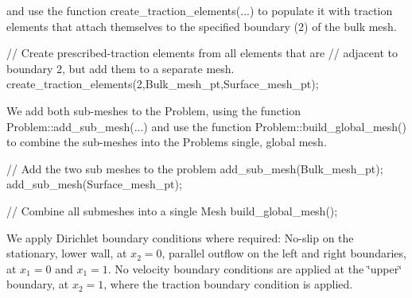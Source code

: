 and use the function {\ttfamily create\+\_\+traction\+\_\+elements}(...) to populate it with traction elements that attach themselves to the specified boundary (2) of the bulk mesh.


\begin{DoxyCodeInclude}

 \textcolor{comment}{// Create prescribed-traction elements from all elements that are }
 \textcolor{comment}{// adjacent to boundary 2, but add them to a separate mesh.}
 create\_traction\_elements(2,Bulk\_mesh\_pt,Surface\_mesh\_pt);

\end{DoxyCodeInclude}


We add both sub-\/meshes to the {\ttfamily Problem}, using the function {\ttfamily Problem\+::add\+\_\+sub\+\_\+mesh}(...) and use the function {\ttfamily Problem\+::build\+\_\+global\+\_\+mesh()} to combine the sub-\/meshes into the {\ttfamily Problem\textquotesingle{}s} single, global mesh.


\begin{DoxyCodeInclude}

 \textcolor{comment}{// Add the two sub meshes to the problem}
 add\_sub\_mesh(Bulk\_mesh\_pt);
 add\_sub\_mesh(Surface\_mesh\_pt);

 \textcolor{comment}{// Combine all submeshes into a single Mesh}
 build\_global\_mesh();

\end{DoxyCodeInclude}


We apply Dirichlet boundary conditions where required\+: No-\/slip on the stationary, lower wall, at $ x_2=0 $, parallel outflow on the left and right boundaries, at $ x_1=0 $ and $ x_1=1 $. No velocity boundary conditions are applied at the \char`\"{}upper\char`\"{} boundary, at $ x_2=1 $, where the traction boundary condition is applied.


